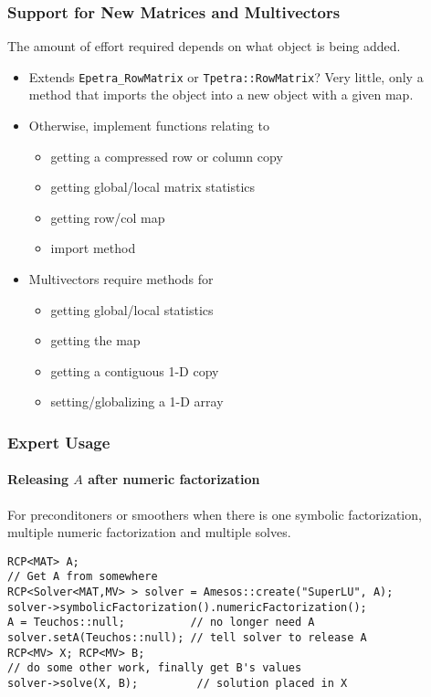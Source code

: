 \documentclass[xcolor=dvipsnames]{beamer}
\begin{document}
\begin{frame}
  \frametitle{Support for New Matrices and Multivectors}
  
  The amount of effort required depends on what object is being added.
  
  \begin{itemize}
    \item Extends \texttt{Epetra\_RowMatrix} or
      \texttt{Tpetra::RowMatrix}?  Very little, only a method that
      imports the object into a new object with a given map.
    \item Otherwise, implement functions relating to
      \begin{itemize}
        \item getting a compressed row or column copy
        \item getting global/local matrix statistics
        \item getting row/col map
        \item import method
      \end{itemize}
    \item Multivectors require methods for
      \begin{itemize}
        \item getting global/local statistics
        \item getting the map
        \item getting a contiguous 1-D copy
        \item setting/globalizing a 1-D array
      \end{itemize}
  \end{itemize}
\end{frame}

\begin{frame}[fragile]
  \frametitle{Expert Usage}
  \framesubtitle{Releasing $A$ after numeric factorization}
  For preconditoners or smoothers when there is one symbolic factorization,
  multiple numeric factorization and multiple solves.
  \begin{lstlisting}
RCP<MAT> A;
// Get A from somewhere
RCP<Solver<MAT,MV> > solver = Amesos::create("SuperLU", A);
solver->symbolicFactorization().numericFactorization();
A = Teuchos::null;          // no longer need A
solver.setA(Teuchos::null); // tell solver to release A
RCP<MV> X; RCP<MV> B;
// do some other work, finally get B's values
solver->solve(X, B);         // solution placed in X
  \end{lstlisting}
\end{frame}
\end{document}
